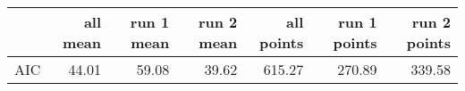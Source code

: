 \documentclass{article}
\begin{document}
\begin{table}[ht]
\centering
\begin{tabular}{rrrrrrr}
\hline
& all mean & run 1 mean & run 2 mean & all points & run 1 points & run 2 points \\ 
\hline
AIC & 44.01 & 59.08 & 39.62 & 615.27 & 270.89 & 339.58 \\ 
\hline
\end{tabular}
\end{table}
\end{document}
